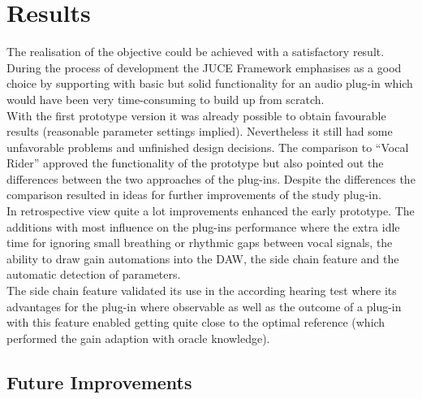 \chapter{Results}
\label{chapter:results}

The realisation of the objective could be achieved with a satisfactory result. During the process of development the JUCE Framework emphasises as a good choice by supporting with basic but solid functionality for an audio plug-in which would have been very time-consuming to build up from scratch.\\
With the first prototype version it was already possible to obtain favourable results (reasonable parameter settings implied). Nevertheless it still had some unfavorable problems and unfinished design decisions. The comparison to “Vocal Rider” approved the functionality of the prototype but also pointed out the differences between the two approaches of the plug-ins. Despite the differences the comparison resulted in ideas for further improvements of the study plug-in.\\
In retrospective view quite a lot improvements enhanced the early prototype. The additions with most influence on the plug-ins performance where the extra idle time for ignoring small breathing or rhythmic gaps between vocal signals, the ability to draw gain automations into the DAW, the side chain feature and the automatic detection of parameters.\\
The side chain feature validated its use in the according hearing test where its advantages for the plug-in where observable as well as the outcome of a plug-in with this feature enabled getting quite close to the optimal reference (which performed the gain adaption with oracle knowledge).\\

\section{Future Improvements}

